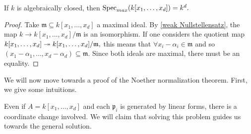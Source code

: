 \begin{corollary}
  If \(k\) is algebraically closed, then
  \(\text{Spec}_{max}(k[x_1, \dotsc, x_d]) = k^d.\)
\end{corollary}
\begin{proof}
  Take
  \(\mathfrak m \subseteq k[x_1, \dotsc, x_d]\)
  a maximal ideal. By \cref{weak Nullstellensatz}, the map
  \(k \to k[x_1, \dotsc, x_d]/{\mathfrak m}\)
  is an isomorphism.
  If one considers the quotient map
  \(k[x_1, \dotsc, x_d] \twoheadrightarrow k[x_1, \dotsc, x_d]/{\mathfrak m},\)
  this means that
  \(\forall x_i - \alpha_i \in \mathfrak m\)
  and so
  \((x_1 - \alpha_1, \dotsc, x_d - \alpha_d) \subseteq \mathfrak m.\)
  Since both ideals are maximal, there must be an equality.
\end{proof}


We will now move towards a proof of the Noether normalization theorem. First, we give some intuitions.

Even if \(A = k[x_1, \dotsc, x_d]\) and each \(\mathfrak p_i\) is generated by linear forms, there is a coordinate change involved. We will claim that solving this problem guides us towards the general solution.

